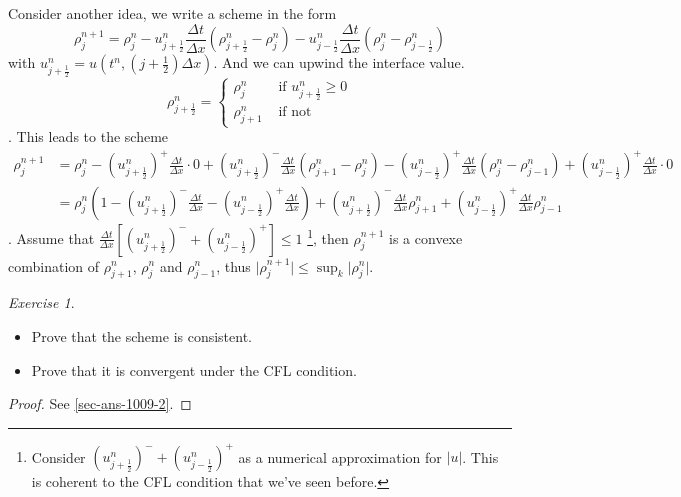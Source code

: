 \documentclass{report}
\theoremstyle{plain}
\theoremstyle{definition}
\theoremstyle{remark}
\newtheorem{exercise}{Exercise}
\begin{document}
Consider another idea, we write a scheme in the form
\begin{equation}
	\rho^{n+1}_j = \rho^n_j
	-u^n_{j+\frac{1}{2}} \frac{ \Delta t}{ \Delta x}
	(\rho^n_{j+\frac{1}{2}} - \rho^n_j)
	-u^n_{j-\frac{1}{2}} \frac{ \Delta t}{ \Delta x}
	( \rho^n_j - \rho^n_{j-\frac{1}{2}})
\end{equation}
with $u^n_{j+\frac{1}{2}} = u(t^n,(j+\frac{1}{2})\Delta x)$.
And we can upwind the interface value.
\begin{equation}
	\rho^n_{j+\frac{1}{2}} = \left\lbrace
	\begin{array}{ll}
		\rho^n_j & \text{ if } u^n_{j+\frac{1}{2}} \ge 0\\
		\rho^n_{j+1} & \text{ if not }
	\end{array}\right.
\end{equation}.
This leads to the scheme
\begin{align*}
	\rho^{n+1}_j & = \rho^n_j
	-(u^n_{j+\frac{1}{2}})^+ \frac{\Delta t}{\Delta x}\cdot 0
	+(u^n_{j+\frac{1}{2}})^- \frac{\Delta t}{\Delta x}
	(\rho^n_{j+1} - \rho^n_j)
	-(u^n_{j-\frac{1}{2}})^+ \frac{\Delta t}{\Delta x}
	(\rho^n_j - \rho^n_{j-1})
	+(u^n_{j-\frac{1}{2}})^+ \frac{\Delta t}{\Delta x}\cdot 0
	\\ &=
	\rho^n_j\left(1-(u^n_{j+\frac{1}{2}})^-\frac{\Delta t}{\Delta x}
	-(u^n_{j-\frac{1}{2}})^+ \frac{\Delta t}{\Delta x}\right)
	+(u^n_{j+\frac{1}{2}})^- \frac{\Delta t}{\Delta x}\rho^n_{j+1}
	+(u^n_{j-\frac{1}{2}})^+ \frac{\Delta t}{\Delta x}\rho^n_{j-1}
\end{align*}.
Assume that $\frac{\Delta t}{\Delta x}\left[(u^n_{j+\frac{1}{2}})^- 
+ (u^n_{j-\frac{1}{2}})^+ \right]\le 1$
\footnote{Consider $(u^n_{j+\frac{1}{2}})^- + (u^n_{j-\frac{1}{2}})^+ $ as a numerical approximation for $\vert u\vert$. This is coherent to
the CFL condition that we've seen before.},
then $\rho^{n+1}_j$ is a convexe combination of
$\rho^n_{j+1}$, $\rho^n_j$ and $\rho^n_{j-1}$,
thus $\vert\rho^{n+1}_j\vert\le\sup_k\vert\rho^n_j\vert$.

\begin{exercise}
	\begin{itemize}
\item Prove that the scheme is consistent.
\item Prove that it is convergent under the CFL condition.
	\end{itemize}
\end{exercise}

\begin{proof}
	See \ref{sec-ans-1009-2}.
\end{proof}
\end{document}
